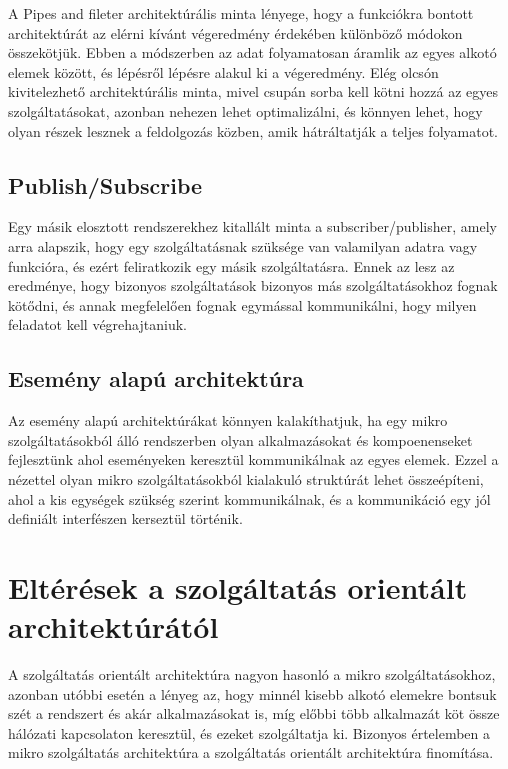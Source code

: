 \documentclass[11pt,magyar,a4paper,oneside,]{report}
\begin{document}
A Pipes and fileter architektúrális minta\citep{pipes-pattern} lényege,
hogy a funkciókra bontott architektúrát az elérni kívánt végeredmény
érdekében különböző módokon összekötjük. Ebben a módszerben az adat
folyamatosan áramlik az egyes alkotó elemek között, és lépésről lépésre
alakul ki a végeredmény. Elég olcsón kivitelezhető architektúrális
minta, mivel csupán sorba kell kötni hozzá az egyes szolgáltatásokat,
azonban nehezen lehet optimalizálni, és könnyen lehet, hogy olyan részek
lesznek a feldolgozás közben, amik hátráltatják a teljes folyamatot.

\subsection{Publish/Subscribe}\label{publishsubscribe}

Egy másik elosztott rendszerekhez kitallált minta a
subscriber/publisher\citep{pub-subscribed}, amely arra alapszik, hogy
egy szolgáltatásnak szüksége van valamilyan adatra vagy funkcióra, és
ezért feliratkozik egy másik szolgáltatásra. Ennek az lesz az eredménye,
hogy bizonyos szolgáltatások bizonyos más szolgáltatásokhoz fognak
kötődni, és annak megfelelően fognak egymással kommunikálni, hogy milyen
feladatot kell végrehajtaniuk.

\subsection{Esemény alapú
architektúra}\label{esemuxe9ny-alapuxfa-architektuxfara}

Az esemény alapú architektúrákat\citep{event-driven-pattern} könnyen
kalakíthatjuk, ha egy mikro szolgáltatásokból álló rendszerben olyan
alkalmazásokat és kompoenenseket fejlesztünk ahol eseményeken keresztül
kommunikálnak az egyes elemek. Ezzel a nézettel olyan mikro
szolgáltatásokból kialakuló struktúrát lehet összeépíteni, ahol a kis
egységek szükség szerint kommunikálnak, és a kommunikáció egy jól
definiált interfészen kerseztül történik.

\section{Eltérések a szolgáltatás orientált
architektúrától}\label{eltuxe9ruxe9sek-a-szolguxe1ltatuxe1s-orientuxe1lt-architektuxfaruxe1tuxf3l}

A szolgáltatás orientált architektúra nagyon hasonló a mikro
szolgáltatásokhoz, azonban utóbbi esetén a lényeg az, hogy minnél kisebb
alkotó elemekre bontsuk szét a rendszert és akár alkalmazásokat is, míg
előbbi több alkalmazát köt össze hálózati kapcsolaton keresztül, és
ezeket szolgáltatja ki. Bizonyos értelemben a mikro szolgáltatás
architektúra a szolgáltatás orientált architektúra finomítása.
\end{document}
